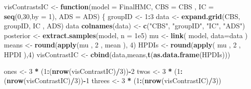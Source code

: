 \documentclass[10pt,dvipsnames,enabledeprecatedfontcommands]{scrartcl}
\newenvironment{Shaded}{\begin{snugshade}}{\end{snugshade}}
\newcommand{\KeywordTok}[1]{\textcolor[rgb]{0.13,0.29,0.53}{\textbf{#1}}}
\newcommand{\DataTypeTok}[1]{\textcolor[rgb]{0.13,0.29,0.53}{#1}}
\newcommand{\DecValTok}[1]{\textcolor[rgb]{0.00,0.00,0.81}{#1}}
\newcommand{\FloatTok}[1]{\textcolor[rgb]{0.00,0.00,0.81}{#1}}
\newcommand{\StringTok}[1]{\textcolor[rgb]{0.31,0.60,0.02}{#1}}
\newcommand{\ControlFlowTok}[1]{\textcolor[rgb]{0.13,0.29,0.53}{\textbf{#1}}}
\newcommand{\OperatorTok}[1]{\textcolor[rgb]{0.81,0.36,0.00}{\textbf{#1}}}
\newcommand{\NormalTok}[1]{#1}
\begin{document}
\begin{Shaded}
\begin{Highlighting}[]
\NormalTok{visContrastsIC <-}\StringTok{ }\ControlFlowTok{function}\NormalTok{(}\DataTypeTok{model =}\NormalTok{ FinalHMC, }\DataTypeTok{CBS =}\NormalTok{ CBS , }\DataTypeTok{IC =}  \KeywordTok{seq}\NormalTok{(}\DecValTok{0}\NormalTok{,}\DecValTok{30}\NormalTok{,}\DataTypeTok{by =} \DecValTok{1}\NormalTok{), }\DataTypeTok{ADS =}\NormalTok{ ADS)}
\NormalTok{\{}
\NormalTok{  groupID <-}\StringTok{ }\DecValTok{1}\OperatorTok{:}\DecValTok{3}
\NormalTok{  data <-}\StringTok{ }\KeywordTok{expand.grid}\NormalTok{(CBS, groupID, IC , ADS)}
\NormalTok{  data}
  \KeywordTok{colnames}\NormalTok{(data) <-}\StringTok{ }\KeywordTok{c}\NormalTok{(}\StringTok{"CBS"}\NormalTok{, }\StringTok{"groupID"}\NormalTok{, }\StringTok{"IC"}\NormalTok{, }\StringTok{"ADS"}\NormalTok{)}
\NormalTok{  posterior <-}\StringTok{ }\KeywordTok{extract.samples}\NormalTok{(model, }\DataTypeTok{n =} \FloatTok{1e5}\NormalTok{)}
\NormalTok{  mu <-}\StringTok{ }\KeywordTok{link}\NormalTok{( model, }\DataTypeTok{data=}\NormalTok{data ) }
\NormalTok{  means <-}\StringTok{  }\KeywordTok{round}\NormalTok{(}\KeywordTok{apply}\NormalTok{(mu , }\DecValTok{2}\NormalTok{ , mean ), }\DecValTok{4}\NormalTok{)}
\NormalTok{  HPDIs <-}\StringTok{ }\KeywordTok{round}\NormalTok{(}\KeywordTok{apply}\NormalTok{( mu , }\DecValTok{2}\NormalTok{ , HPDI ),}\DecValTok{4}\NormalTok{)}
\NormalTok{  visContrastIC <-}\StringTok{ }\KeywordTok{cbind}\NormalTok{(data,means,}\KeywordTok{t}\NormalTok{(}\KeywordTok{as.data.frame}\NormalTok{(HPDIs)))}
  
\NormalTok{  ones <-}\StringTok{ }\DecValTok{3} \OperatorTok{*}\StringTok{ }\NormalTok{(}\DecValTok{1}\OperatorTok{:}\NormalTok{(}\KeywordTok{nrow}\NormalTok{(visContrastIC)}\OperatorTok{/}\DecValTok{3}\NormalTok{))}\OperatorTok{-}\DecValTok{2}
\NormalTok{  twos <-}\StringTok{ }\DecValTok{3} \OperatorTok{*}\StringTok{ }\NormalTok{(}\DecValTok{1}\OperatorTok{:}\NormalTok{(}\KeywordTok{nrow}\NormalTok{(visContrastIC)}\OperatorTok{/}\DecValTok{3}\NormalTok{))}\OperatorTok{-}\DecValTok{1}
\NormalTok{  threes <-}\StringTok{ }\DecValTok{3} \OperatorTok{*}\StringTok{ }\NormalTok{(}\DecValTok{1}\OperatorTok{:}\NormalTok{(}\KeywordTok{nrow}\NormalTok{(visContrastIC)}\OperatorTok{/}\DecValTok{3}\NormalTok{))}
  

\end{Highlighting}
\end{Shaded}
\end{document}

